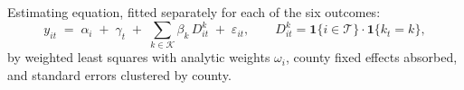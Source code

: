 \providecommand{\Tr}{\mathcal{T}}
\providecommand{\Dn}{\mathcal{D}}
\providecommand{\ind}{\mathbf{1}}
\providecommand{\lp}{log-\%}

\begingroup
\footnotesize
\setlength{\tabcolsep}{4pt}
\renewcommand{\arraystretch}{1.12}

\begin{center}\small
Estimating equation, fitted separately for each of the six outcomes:
\[
y_{it}\;=\;\alpha_i\;+\;\gamma_t\;+\;\sum_{k\in\mathcal{K}}\beta_k\,D^{k}_{it}\;+\;\varepsilon_{it},
\qquad
D^{k}_{it}=\ind\{i\in\Tr\}\cdot\ind\{k_t=k\},
\]
by weighted least squares with analytic weights $\omega_i$, county fixed effects absorbed,
and standard errors clustered by county.
\end{center}

